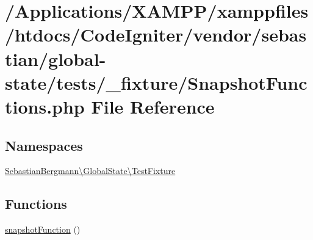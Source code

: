 \hypertarget{_snapshot_functions_8php}{}\section{/\+Applications/\+X\+A\+M\+P\+P/xamppfiles/htdocs/\+Code\+Igniter/vendor/sebastian/global-\/state/tests/\+\_\+fixture/\+Snapshot\+Functions.php File Reference}
\label{_snapshot_functions_8php}
\subsection*{Namespaces}
\begin{DoxyCompactItemize}
\item 
 \mbox{\hyperlink{namespace_sebastian_bergmann_1_1_global_state_1_1_test_fixture}{Sebastian\+Bergmann\textbackslash{}\+Global\+State\textbackslash{}\+Test\+Fixture}}
\end{DoxyCompactItemize}
\subsection*{Functions}
\begin{DoxyCompactItemize}
\item 
\mbox{\hyperlink{namespace_sebastian_bergmann_1_1_global_state_1_1_test_fixture_aa9a1e3ca77bd927a1daf63ba6ab56fdf}{snapshot\+Function}} ()
\end{DoxyCompactItemize}
